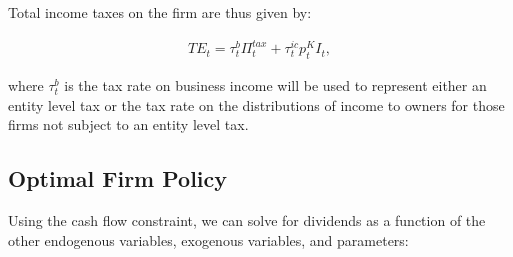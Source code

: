%
%



Total income taxes on the firm are thus given by:

\begin{equation}
\label{eqn:corp_tax}
\begin{split}
TE_{t}= \tau^{b}_{t}\Pi^{tax}_{t} +\tau^{ic}_{t}p^{K}_{t}I_{t},
\end{split}
\end{equation}

\noindent\noindent  where $\tau^{b}_{t}$ is the tax rate on business income will be used to represent either an entity level tax or the tax rate on the distributions of income to owners for those firms not subject to an entity level tax.  

\subsection{Optimal Firm Policy}

Using the cash flow constraint, we can solve for dividends as a function of the other endogenous variables, exogenous variables, and parameters:

